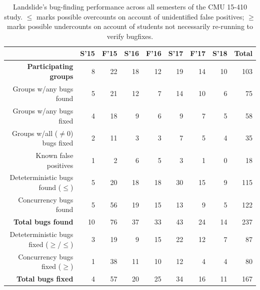 \begin{table}[t]
	\begin{center}
		\small
	\begin{tabular}{r||r|r|r|r|r|r|r||r}
			& \bf S'15 & \bf F'15 & \bf S'16 & \bf F'16 & \bf S'17 & \bf F'17 & \bf S'18 & \bf Total \\
			\hline
			\bf Participating groups& 8	& 22	& 18	& 12	& 19	& 14	& 10	& 103	\\
			Groups w/any bugs found	& 5	& 21	& 12	& 7	& 14	& 10	& 6	& 75	\\
			Groups w/any bugs fixed	& 4	& 18	& 9	& 6	& 9	& 7	& 5	& 58	\\
			Groups w/all ($\ne$0) bugs fixed
						& 2	& 11	& 3	& 3	& 7	& 5	& 4	& 35	\\
			\hline

			Known false positives	& 1	& 2	& 6	& 5	& 3	& 1	& 0	& 18 	\\
			\hline
			Deteterministic bugs found ($\le$)
						& 5	& 20	& 18	& 18	& 30	& 15	& 9	& 115	\\
			Concurrency bugs found	& 5	& 56	& 19	& 15	& 13	& 9	& 5	& 122	\\
			\bf Total bugs found	& 10	& 76	& 37	& 33	& 43	& 24	& 14	& 237	\\
			\hline
			Deteterministic bugs fixed ($\ge$/$\le$)
						& 3	& 19	& 9	& 15	& 22	& 12	& 7	& 87	\\
			Concurrency bugs fixed ($\ge$)
						& 1	& 38	& 11	& 10	& 12	& 4	& 4	& 80	\\
			\bf Total bugs fixed	& 4	& 57	& 20	& 25	& 34	& 16	& 11	& 167	\\
	\end{tabular}
	\end{center}
	\caption[Landslide's bug-finding performance across all semesters.]
		{Landslide's bug-finding performance across all semesters of the CMU 15-410 study.
	$\le$ marks possible overcounts on account of unidentified false positives;
	$\ge$ marks possible undercounts on account of students not necessarily re-running to verify bugfixes.}
	\label{tab:cmubugs}
\end{table}

